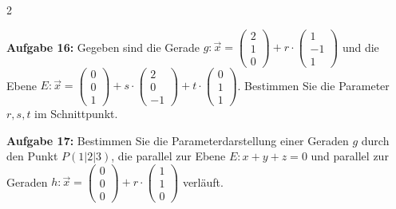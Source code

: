 \documentclass[12pt,a4paper]{article}
\newcommand{\vek}[1]{\vec{#1}}
\begin{document}
\begin{multicols}{2}
\vspace{3cm}

\textbf{Aufgabe 16:} Gegeben sind die Gerade $g: \vek{x} = \begin{pmatrix}2\\1\\0\end{pmatrix} + r \cdot \begin{pmatrix}1\\-1\\1\end{pmatrix}$ und die Ebene $E: \vek{x} = \begin{pmatrix}0\\0\\1\end{pmatrix} + s \cdot \begin{pmatrix}2\\0\\-1\end{pmatrix} + t \cdot \begin{pmatrix}0\\1\\1\end{pmatrix}$.
Bestimmen Sie die Parameter $r, s, t$ im Schnittpunkt.

\vspace{3cm}

\textbf{Aufgabe 17:} Bestimmen Sie die Parameterdarstellung einer Geraden $g$ durch den Punkt $P(1|2|3)$, die parallel zur Ebene $E: x + y + z = 0$ und parallel zur Geraden $h: \vek{x} = \begin{pmatrix}0\\0\\0\end{pmatrix} + r \cdot \begin{pmatrix}1\\1\\0\end{pmatrix}$ verläuft.

\vspace{3cm}


\end{multicols}
\end{document}

